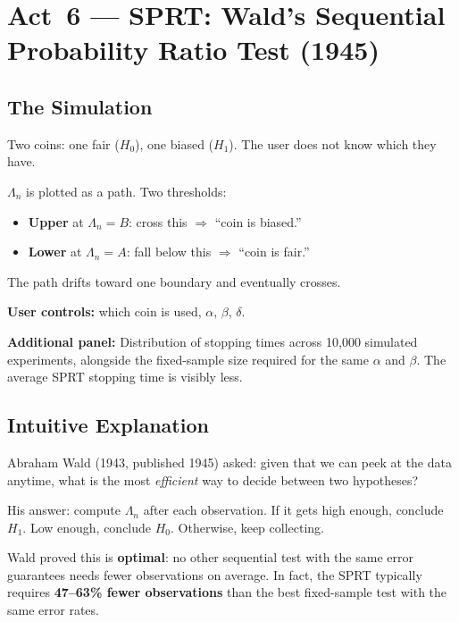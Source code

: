\documentclass[12pt, a4paper]{article}
\newcommand{\LR}{\Lambda}              %
\begin{document}
\section{Act~6 --- SPRT: Wald's Sequential Probability Ratio Test (1945)}

\subsection{The Simulation}

\begin{simulation}
Two coins: one fair ($H_0$), one biased ($H_1$).  The user does not know
which they have.

$\LR_n$ is plotted as a path.  Two thresholds:
\begin{itemize}[nosep]
  \item \textbf{Upper} at $\LR_n = B$: cross this $\Rightarrow$ ``coin is biased.''
  \item \textbf{Lower} at $\LR_n = A$: fall below this $\Rightarrow$
        ``coin is fair.''
\end{itemize}
The path drifts toward one boundary and eventually crosses.

\textbf{User controls:} which coin is used, $\alpha$, $\beta$, $\delta$.

\textbf{Additional panel:} Distribution of stopping times across 10,000
simulated experiments, alongside the fixed-sample size required for the same
$\alpha$ and $\beta$.  The average SPRT stopping time is visibly less.
\end{simulation}

\subsection{Intuitive Explanation}

\begin{intuition}
Abraham Wald (1943, published 1945) asked: given that we can peek at the data
anytime, what is the most \emph{efficient} way to decide between two
hypotheses?

His answer: compute $\LR_n$ after each observation.  If it gets high enough,
conclude $H_1$.  Low enough, conclude $H_0$.  Otherwise, keep collecting.

Wald proved this is \textbf{optimal}: no other sequential test with the same
error guarantees needs fewer observations on average.  In fact, the SPRT
typically requires \textbf{47--63\% fewer observations} than the best
fixed-sample test with the same error rates.
\end{intuition}
\end{document}

